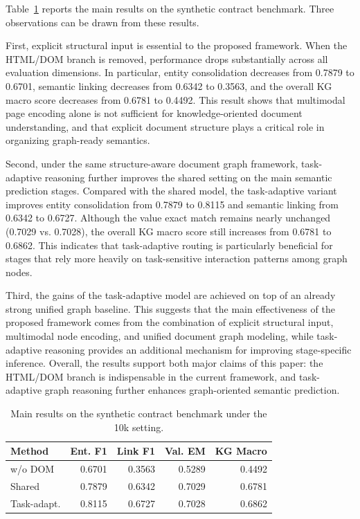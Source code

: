 \documentclass[pdflatex,twocolumn,iicol,sn-vancouver-num]{sn-jnl}%
\theoremstyle{thmstyleone}%
\theoremstyle{thmstyletwo}%
\theoremstyle{thmstylethree}%
\begin{document}
Table~\ref{tab:main_results_10k} reports the main results on the synthetic contract benchmark. Three observations can be drawn from these results.

First, explicit structural input is essential to the proposed framework. When the HTML/DOM branch is removed, performance drops substantially across all evaluation dimensions. In particular, entity consolidation decreases from 0.7879 to 0.6701, semantic linking decreases from 0.6342 to 0.3563, and the overall KG macro score decreases from 0.6781 to 0.4492. This result shows that multimodal page encoding alone is not sufficient for knowledge-oriented document understanding, and that explicit document structure plays a critical role in organizing graph-ready semantics.

Second, under the same structure-aware document graph framework, task-adaptive reasoning further improves the shared setting on the main semantic prediction stages. Compared with the shared model, the task-adaptive variant improves entity consolidation from 0.7879 to 0.8115 and semantic linking from 0.6342 to 0.6727. Although the value exact match remains nearly unchanged (0.7029 vs. 0.7028), the overall KG macro score still increases from 0.6781 to 0.6862. This indicates that task-adaptive routing is particularly beneficial for stages that rely more heavily on task-sensitive interaction patterns among graph nodes.

Third, the gains of the task-adaptive model are achieved on top of an already strong unified graph baseline. This suggests that the main effectiveness of the proposed framework comes from the combination of explicit structural input, multimodal node encoding, and unified document graph modeling, while task-adaptive reasoning provides an additional mechanism for improving stage-specific inference. Overall, the results support both major claims of this paper: the HTML/DOM branch is indispensable in the current framework, and task-adaptive graph reasoning further enhances graph-oriented semantic prediction.



\begin{table}[!htbp]
\centering
\footnotesize
\setlength{\tabcolsep}{2pt}
\caption{Main results on the synthetic contract benchmark under the 10k setting.}
\label{tab:main_results_10k}
\begin{tabular}{@{}lrrrr@{}}
\toprule
Method & Ent. F1 & Link F1 & Val. EM & KG Macro \\
\midrule
w/o DOM & 0.6701 & 0.3563 & 0.5289 & 0.4492 \\
Shared & 0.7879 & 0.6342 & 0.7029 & 0.6781 \\
Task-adapt. & 0.8115 & 0.6727 & 0.7028 & 0.6862 \\
\bottomrule
\end{tabular}
\end{table}
\end{document}
